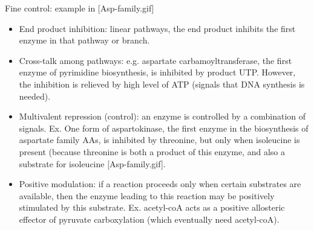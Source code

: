 \documentclass{report}
\begin{document}
\begin{enumerate}
Fine control: example in [Asp-family.gif]
\begin{itemize}
	\item End product inhibition: linear pathways, the end product inhibits the first enzyme in that pathway or branch. 
	\item Cross-talk among pathways: e.g. aspartate carbamoyltransferase, the first enzyme of pyrimidine biosynthesis, is inhibited by product UTP. However, the inhibition is relieved by high level of ATP (signals that DNA synthesis is needed).
	\item Multivalent repression (control): an enzyme is controlled by a combination of signals. Ex. One form of aspartokinase, the first enzyme in the biosynthesis of aspartate family AAs, is inhibited by threonine, but only when isoleucine is present (because threonine is both a product of this enzyme, and also a substrate for isoleucine [Asp-family.gif]. 
	\item Positive modulation: if a reaction proceeds only when certain substrates are available, then the enzyme leading to this reaction may be positively stimulated by this substrate. Ex. acetyl-coA acts as a positive allosteric effector of pyruvate carboxylation (which eventually need acetyl-coA). 
\end{itemize}


\end{enumerate}
\end{document}
